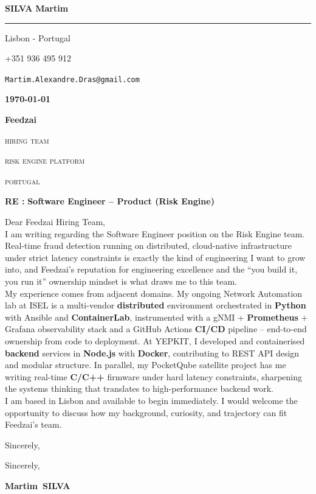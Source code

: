 \documentclass[12pt]{article}
\newcommand{\firstname}{Martim}
\newcommand{\lastname}{Silva}
\newcommand{\mainColor}{feedzaiRed}
\newlength{\spacebox}
\newcommand{\shspace}{\hspace*{0.8em}}
\newcommand{\xvspace}{\vspace*{0.1em}}
\newcommand{\svspace}{\vspace*{0.5em}}
\newcommand{\mvspace}{\vspace*{1.5em}}
\newcommand{\hvspace}{\vspace*{2.5em}}
\newcommand{\negmvspace}{\vspace*{-1em}}
\newcommand{\userInfo}[4]{
    \begin{flushleft}
        \color{\mainColor}
        \Huge
        \textbf{\MakeUppercase{\lastname}}
        \color{black}
        \textbf{\firstname}
        \color{\mainColor}
        \noindent\rule{19.1cm}{0.8pt}
        \color{grayShy}
        \small
        \par
        \parbox{7\spacebox} {
            \faMap \shspace #1 - #2 \par \svspace
            \faPhone \shspace #3 \par \svspace
            \faEnvelopeOpen \shspace \texttt{#4} \par \svspace
        }
        \color{\mainColor}
        \mvspace
    \end{flushleft}
    \negmvspace
}
\newcommand{\companyInfo}[4]{
    \begin{flushright}
        \parbox{4\spacebox}{
            \raggedleft
            \small
            \textbf{\today}\par
            \xvspace
            \textbf{#1}\par
            \mvspace
            \color{grayShy} \textsc{\MakeLowercase{#2}}\par
            \xvspace
            \textsc{\MakeLowercase{#3}}\par
            \xvspace
            \textsc{\MakeLowercase{#4}}\par
            \color{black}
        }
    \end{flushright}
    \hvspace
}
\newcommand{\object}[1]{
    \small
    \color{\mainColor} \textbf{RE :} \color{black} \textbf{#1} \par
}
\newcommand{\content}[2]{
    \mvspace
    \begin{flushleft}
        \parbox{10.3\spacebox}{
          #1\par
          \svspace
          #2
        }\par
    \end{flushleft}
}
\newcommand{\signature}{
    \svspace
    \parbox{3\spacebox}{
      Sincerely,\par
      \svspace \hspace{-0.3em}
      \textbf{\color{\mainColor} \firstname\ \MakeUppercase{\lastname}}\par
      \svspace \svspace
      \Huge \faPenNib\par
    }\par
}
\begin{document}
\selectfont
\userInfo{Lisbon}{Portugal}{+351 936 495 912}{Martim.Alexandre.Dras@gmail.com}
\companyInfo{Feedzai}{Hiring Team}{Risk Engine Platform}{Portugal}
\object{Software Engineer -- Product (Risk Engine)}
\content{
  Dear Feedzai Hiring Team, \\

  I am writing regarding the Software Engineer position on the Risk Engine team.
  Real-time fraud detection running on distributed, cloud-native infrastructure
  under strict latency constraints is exactly the kind of engineering I want to
  grow into, and Feedzai's reputation for engineering excellence and the
  ``you build it, you run it'' ownership mindset is what draws me to this team. \\

  My experience comes from adjacent domains. My ongoing Network Automation lab at
  ISEL is a multi-vendor \textbf{distributed} environment orchestrated in
  \textbf{Python} with Ansible and \textbf{ContainerLab}, instrumented with a
  gNMI + \textbf{Prometheus} + Grafana observability stack and a GitHub Actions
  \textbf{CI/CD} pipeline -- end-to-end ownership from code to deployment. At
  YEPKIT, I developed and containerised \textbf{backend} services in \textbf{Node.js}
  with \textbf{Docker}, contributing to REST API design and modular structure. In
  parallel, my PocketQube satellite project has me writing real-time
  \textbf{C/C++} firmware under hard latency constraints, sharpening the systems
  thinking that translates to high-performance backend work. \\

  I am based in Lisbon and available to begin immediately. I would welcome the
  opportunity to discuss how my background, curiosity, and trajectory can fit
  Feedzai's team. \\
}{Sincerely,}
\signature
\end{document}
